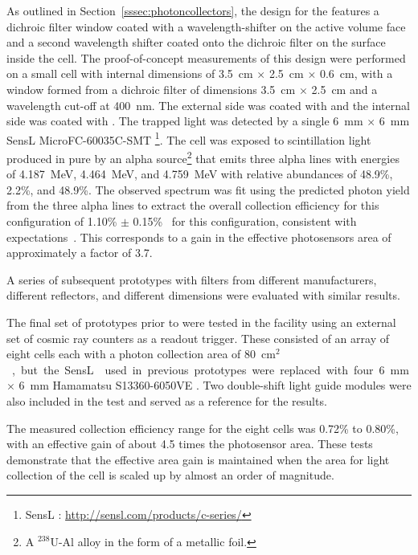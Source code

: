 As outlined in Section~\ref{sssec:photoncollectors}, the design for the  features a dichroic filter window coated with a wavelength-shifter on the  active volume face and a second wavelength shifter coated onto the dichroic filter on the surface inside the cell.  
The proof-of-concept measurements of this design were performed on a small cell with internal dimensions of \SI{3.5}{cm} $\times$ \SI{2.5}{cm} $\times$ \SI{0.6}{cm}, with a window formed from a dichroic filter of  dimensions \SI{3.5}{cm} $\times$ \SI{2.5}{cm} and a wavelength cut-off at \SI{400}{nm}. The external side was coated with  and the internal side was coated with . 
The trapped light was detected by a single \SI{6}{mm} $\times$ \SI{6}{mm} SensL MicroFC-60035C-SMT \footnote{SensL : \url{http://sensl.com/products/c-series/}}. The cell was exposed to scintillation light produced in pure  by an alpha source\footnote{A $^{238}$U-Al alloy in the form of a metallic foil.} that emits three alpha lines with energies of  \SI{4.187}{MeV}, \SI{4.464}{MeV}, and \SI{4.759}{MeV} with relative abundances of 48.9\%, 2.2\%, and 48.9\%. %
The observed spectrum was fit using the predicted photon yield from the three alpha lines to extract the overall collection efficiency for this configuration of 1.10\% $\pm$ 0.15\%~\cite{Segreto:2018jdx} for this configuration, consistent with  expectations~\cite{Marinho:2018doi}. This corresponds to a gain in the effective photosensors area of approximately a factor of \num{3.7}. 

A series of subsequent prototypes with filters from different manufacturers, different reflectors, and different dimensions were evaluated with similar results. 

The final set of prototypes prior to  were tested in the  facility using an external set of cosmic ray counters as a readout trigger. These consisted of an array of eight  cells each with a photon collection area of \SI{80}{cm$^2$}, but the SensL  used in previous prototypes were replaced with four \SI{6}{mm} $\times$ \SI{6}{mm} Hamamatsu S13360-6050VE . 
Two double-shift light guide modules were also included in the test and served as a reference for the  results.

The measured collection efficiency range for the eight  cells was 0.72\% to 0.80\%, with an effective  gain of about 4.5 times the photosensor area. These tests demonstrate that the effective area gain is maintained when the area for light collection of the cell is scaled up by almost an order of magnitude.

